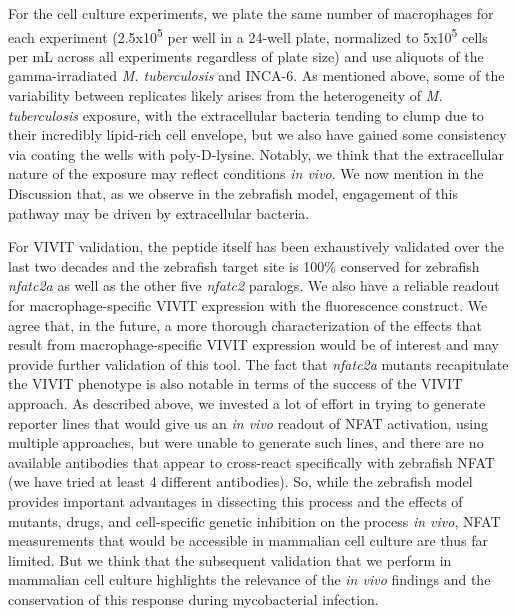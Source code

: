 \begin{description}[style=multiline, labelwidth=\widthof{Reviewer \#2:   }, font=\normalfont, leftmargin=\labelwidth, align=right]
\item[Response: ] \quad For the cell culture experiments, we plate the same number of macrophages for each experiment (2.5x10\textsuperscript{5} per well in a 24\hyp{}well plate, normalized to 5x10\textsuperscript{5} cells per mL across all experiments regardless of plate size) and use aliquots of the gamma\hyp{}irradiated \textit{M. tuberculosis} and INCA\hyp{}6. As mentioned above, some of the variability between replicates likely arises from the heterogeneity of \textit{M. tuberculosis} exposure, with the extracellular bacteria tending to clump due to their incredibly lipid\hyp{}rich cell envelope, but we also have gained some consistency via coating the wells with poly\hyp{}D\hyp{}lysine. Notably, we think that the extracellular nature of the exposure may reflect conditions \textit{in vivo}. We now mention in the Discussion that, as we observe in the zebrafish model, engagement of this pathway may be driven by extracellular bacteria.

\item \quad For VIVIT validation, the peptide itself has been exhaustively validated over the last two decades and the zebrafish target site is 100\% conserved for zebrafish \textit{nfatc2a} as well as the other five \textit{nfatc2} paralogs. We also have a reliable readout for macrophage\hyp{}specific VIVIT expression with the fluorescence construct. We agree that, in the future, a more thorough characterization of the effects that result from macrophage\hyp{}specific VIVIT expression would be of interest and may provide further validation of this tool. The fact that \textit{nfatc2a} mutants recapitulate the VIVIT phenotype is also notable in terms of the success of the VIVIT approach. As described above, we invested a lot of effort in trying to generate reporter lines that would give us an \textit{in vivo} readout of NFAT activation, using multiple approaches, but were unable to generate such lines, and there are no available antibodies that appear to cross\hyp{}react specifically with zebrafish NFAT (we have tried at least 4 different antibodies). So, while the zebrafish model provides important advantages in dissecting this process and the effects of mutants, drugs, and cell\hyp{}specific genetic inhibition on the process \textit{in vivo}, NFAT measurements that would be accessible in mammalian cell culture are thus far limited. But we think that the subsequent validation that we perform in mammalian cell culture highlights the relevance of the \textit{in vivo} findings and the conservation of this response during mycobacterial infection. 


\end{description}
